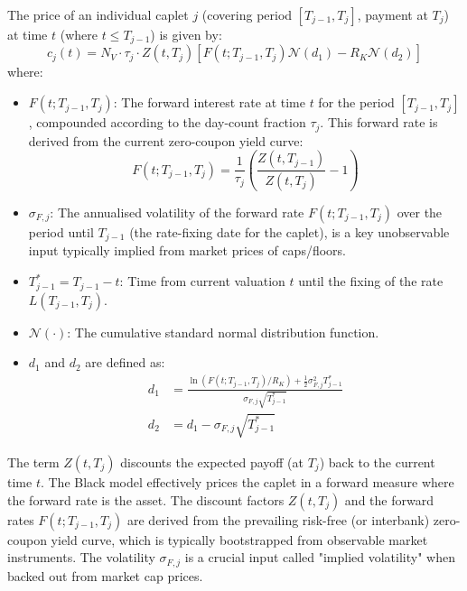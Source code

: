 \documentclass[11pt, a4paper, british]{article}
\begin{document}
The price of an individual caplet $j$ (covering period $[T_{j-1}, T_j]$, payment at $T_j$) at time $t$ (where $t \le T_{j-1}$) is given by:
\begin{equation}
 c_j(t) = N_V \cdot \tau_j \cdot Z(t, T_j) \left[ F(t; T_{j-1}, T_j) \mathcal{N}(d_1) - R_K \mathcal{N}(d_2) \right]
 \label{eq:caplet_black_model}
\end{equation}
where:
\begin{itemize}
 \item $F(t; T_{j-1}, T_j)$: The forward interest rate at time $t$ for the period $[T_{j-1}, T_j]$, compounded according to the day-count fraction $\tau_j$. This forward rate is derived from the current zero-coupon yield curve:
 \begin{equation}
 F(t; T_{j-1}, T_j) = \frac{1}{\tau_j} \left( \frac{Z(t, T_{j-1})}{Z(t, T_j)} - 1 \right)
 \label{eq:forward_rate_from_zeros}
 \end{equation}
 \item $\sigma_{F,j}$: The annualised volatility of the forward rate $F(t; T_{j-1}, T_j)$ over the period until $T_{j-1}$ (the rate-fixing date for the caplet), is a key unobservable input typically implied from market prices of caps/floors.
 \item $T_{j-1}^* = T_{j-1} - t$: Time from current valuation $t$ until the fixing of the rate $L(T_{j-1}, T_j)$.
 \item $\mathcal{N}(\cdot)$: The cumulative standard normal distribution function.
 \item $d_1$ and $d_2$ are defined as:
 \begin{align}
 d_1 &= \frac{\ln(F(t; T_{j-1}, T_j) / R_K) + \frac{1}{2}\sigma_{F,j}^2 T_{j-1}^*}{\sigma_{F,j} \sqrt{T_{j-1}^*}} \label{eq:caplet_d1} \\
 d_2 &= d_1 - \sigma_{F,j} \sqrt{T_{j-1}^*} \label{eq:caplet_d2}
 \end{align}
\end{itemize}
The term $Z(t, T_j)$ discounts the expected payoff (at $T_j$) back to the current time $t$. The Black model effectively prices the caplet in a forward measure where the forward rate is the asset. The discount factors $Z(t, T_j)$ and the forward rates $F(t; T_{j-1}, T_j)$ are derived from the prevailing risk-free (or interbank) zero-coupon yield curve, which is typically bootstrapped from observable market instruments. The volatility $\sigma_{F,j}$ is a crucial input called "implied volatility" when backed out from market cap prices.


\newpage
\end{document}
